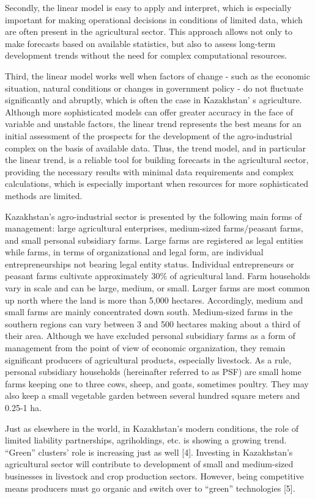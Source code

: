 Secondly, the linear model is easy to apply and interpret, which is
especially important for making operational decisions in conditions of
limited data, which are often present in the agricultural sector. This
approach allows not only to make forecasts based on available
statistics, but also to assess long-term development trends without the
need for complex computational resources.

Third, the linear model works well when factors of change - such as the
economic situation, natural conditions or changes in government policy -
do not fluctuate significantly and abruptly, which is often the case in
Kazakhstan' s agriculture. Although more sophisticated
models can offer greater accuracy in the face of variable and unstable
factors, the linear trend represents the best means for an initial
assessment of the prospects for the development of the agro-industrial
complex on the basis of available data. Thus, the trend model, and in
particular the linear trend, is a reliable tool for building forecasts
in the agricultural sector, providing the necessary results with minimal
data requirements and complex calculations, which is especially
important when resources for more sophisticated methods are limited.

Kazakhstan's agro-industrial sector is presented by the following main
forms of management: large agricultural enterprises, medium-sized
farms/peasant farms, and small personal subsidiary farms. Large farms
are registered as legal entities while farms, in terms of organizational
and legal form, are individual entrepreneurships not bearing legal
entity status. Individual entrepreneurs or peasant farms cultivate
approximately 30\% of agricultural land. Farm households vary in scale
and can be large, medium, or small. Larger farms are most common up
north where the land is more than 5,000 hectares. Accordingly, medium
and small farms are mainly concentrated down south. Medium-sized farms
in the southern regions can vary between 3 and 500 hectares making about
a third of their area. Although we have excluded personal subsidiary
farms as a form of management from the point of view of economic
organization, they remain significant producers of agricultural
products, especially livestock. As a rule, personal subsidiary
households (hereinafter referred to as PSF) are small home farms keeping
one to three cows, sheep, and goats, sometimes poultry. They may also
keep a small vegetable garden between several hundred square meters and
0.25-1 ha.

Just as elsewhere in the world, in Kazakhstan's modern conditions, the
role of limited liability partnerships, agriholdings, etc. is showing a
growing trend. ``Green'' clusters' role is increasing just as well
{[}4{]}. Investing in Kazakhstan's agricultural sector will contribute
to development of small and medium-sized businesses in livestock and
crop production sectors. However, being competitive means producers must
go organic and switch over to ``green'' technologies {[}5{]}.

